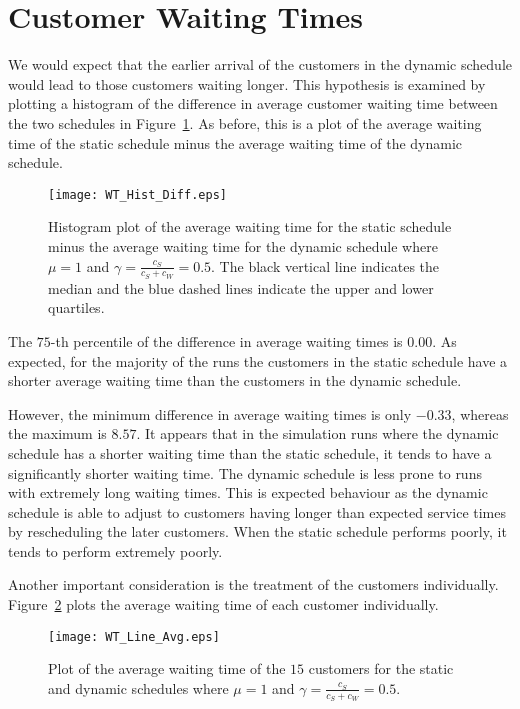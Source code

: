 \section{Customer Waiting Times}
We would expect that the earlier arrival of the customers in the dynamic schedule would lead to those customers waiting longer. This hypothesis is examined by plotting a histogram of the difference in average customer waiting time between the two schedules in Figure~\ref{fig:Diff_Wait}. As before, this is a plot of the average waiting time of the static schedule minus the average waiting time of the dynamic schedule.
\begin{figure}[htb]
	\centering
	\texttt{[image: WT\_Hist\_Diff.eps]}
	\caption{Histogram plot of the average waiting time for the static schedule minus the average waiting time for the dynamic schedule where $\mu = 1$ and $\gamma = \frac{c_{S}}{c_{S} + c_{W}} = 0.5$. The black vertical line indicates the median and the blue dashed lines indicate the upper and lower quartiles.}
	\label{fig:Diff_Wait}
\end{figure}

The $75$-th percentile of the difference in average waiting times is $0.00$. As expected, for the majority of the runs the customers in the static schedule have a shorter average waiting time than the customers in the dynamic schedule.

However, the minimum difference in average waiting times is only $-0.33$, whereas the maximum is $8.57$. It appears that in the simulation runs where the dynamic schedule has a shorter waiting time than the static schedule, it tends to have a significantly shorter waiting time. The dynamic schedule is less prone to runs with extremely long waiting times. This is expected behaviour as the dynamic schedule is able to adjust to customers having longer than expected service times by rescheduling the later customers. When the static schedule performs poorly, it tends to perform extremely poorly.

Another important consideration is the treatment of the customers individually. Figure~\ref{fig:Avg_Wait_Position} plots the average waiting time of each customer individually.
\begin{figure}[htb]
	\centering
	\texttt{[image: WT\_Line\_Avg.eps]}
	\caption{Plot of the average waiting time of the $15$ customers for the static and dynamic schedules where $\mu = 1$ and $\gamma = \frac{c_{S}}{c_{S} + c_{W}} = 0.5$.}
	\label{fig:Avg_Wait_Position}
\end{figure}

